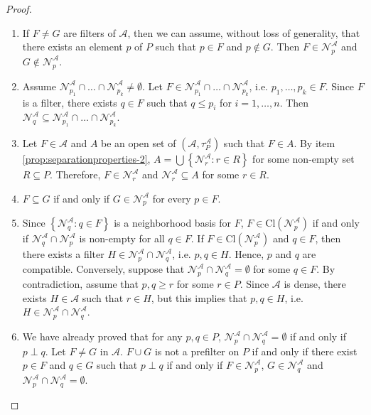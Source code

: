\documentclass{article}
\newcommand{\aaa}{\mathcal{A} }
\newcommand{\open}[1]{\mathcal{N}^{\mathcal{A}}_{#1}}
\newcommand{\atpa}{(\aaa, \tau^\aaa_P)}
\theoremstyle{plain}
\theoremstyle{definition}
\theoremstyle{remark}
\newcommand{\Cl}[1]{\text{Cl}\left(#1\right)}
\newcommand{\bp}[1]{\left\lbrace #1 \right\rbrace}
\newcommand{\0}{\mathbbm 0}
\newcommand{\1}{\mathbbm 1}
\newcommand{\2}{\mathbbm 2}
\begin{document}
\begin{proof} $ $
    \begin{enumerate}
        \item[\ref{prop:separationproperties-1}] If $F \neq G$ are filters of $\aaa$, then we can assume, without loss of generality, that there exists an element $p$ of $P$ such that  $p \in F$ and $p \notin G$. Then $F \in \open{p}$ and $G \notin \open{p}$. 
        

         \item[\ref{prop:separationproperties-2}]  Assume $\open{p_1} \cap \dots \cap \open{p_k} \neq \emptyset$. Let $F \in \open{p_1} \cap \dots \cap \open{p_k} $, i.e. $p_1,\dots,p_k \in F$. Since $F$ is a filter, there exists $q \in F$ such that $q \leq p_i$ for $i=1, \dots, n$. Then  $\open{q} \subseteq \open{p_1} \cap \dots \cap \open{p_k}$. 


         \item[\ref{prop:separationproperties-3}]  Let $F \in \aaa$ and $A$ be an open set of $\atpa$ such that $F \in A$. By item \ref{prop:separationproperties-2}, $A = \bigcup \bp{\open{r} : r \in R}$ for some non-empty set $ R \subseteq P$. Therefore, $F \in \open{r}$ and $\open{r} \subseteq A$ for some $r \in R$.  


         \item[\ref{prop:separationproperties-4}]   $F \subseteq G$ if and only if $G \in \open{p}$ for every $p \in F$. 


         \item[\ref{prop:separationproperties-5}]    Since $\bp{\open{q}: q \in F}$ is a neighborhood basis for $F$, $F \in \Cl{\open{p}}$ if and only if $\open{q} \cap \open{p} $ is non-empty for all $q \in F$. If $F \in \Cl{\open{p}}$ and $q \in F$, then there exists a filter $H \in \open{p} \cap \open{q}$, i.e. $p,q \in H$. Hence, $p$ and $q$ are compatible. Conversely, suppose that $\open{p} \cap \open{q}=\emptyset$ for some $q \in F$. By contradiction, assume that $p,q\geq r$ for some $r \in P$.
         Since $\aaa$ is dense, there exists $H\in\aaa$ such that $r \in H$, but this implies that $p,q \in H$, i.e. $H \in \open{p} \cap \open{q}$.   


         \item[\ref{prop:separationproperties-6}]  We have already proved that for any $p,q \in P$, $\open{p} \cap \open{q}=\emptyset$ if and only if $p \perp q$. Let $F\neq G$ in $\aaa$. $F \cup G$ is not a prefilter on $P$ if and only if there exist $p \in F$ and $q \in G$ such that $p \perp q$ if and only if $F \in \open{p}$, $G \in \open{q}$ and $\open{p} \cap \open{q}=\emptyset$.


\end{enumerate}
\end{proof}
\end{document}
